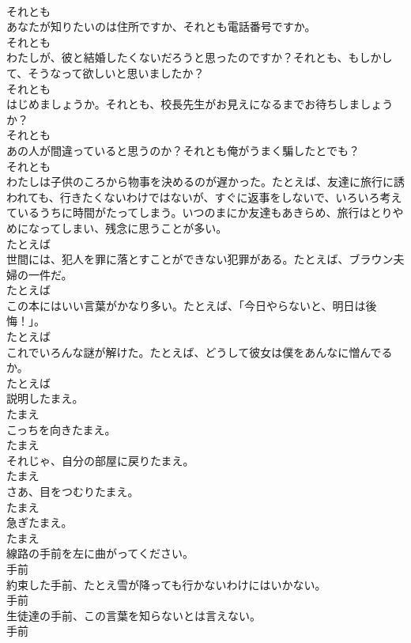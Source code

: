 \documentclass[8pt]{extreport}
\begin{document}
\begin{CJK}{UTF8}{min}
\\	それとも
\\	あなたが知りたいのは住所ですか、それとも電話番号ですか。	
\\	それとも
\\	わたしが、彼と結婚したくないだろうと思ったのですか？それとも、もしかして、そうなって欲しいと思いましたか？	
\\	それとも
\\	はじめましょうか。それとも、校長先生がお見えになるまでお待ちしましょうか？	
\\	それとも
\\	あの人が間違っていると思うのか？それとも俺がうまく騙したとでも？	
\\	それとも
\\	わたしは子供のころから物事を決めるのが遅かった。たとえば、友達に旅行に誘われても、行きたくないわけではないが、すぐに返事をしないで、いろいろ考えているうちに時間がたってしまう。いつのまにか友達もあきらめ、旅行はとりやめになってしまい、残念に思うことが多い。	
\\	たとえば
\\	世間には、犯人を罪に落とすことができない犯罪がある。たとえば、ブラウン夫婦の一件だ。	
\\	たとえば
\\	この本にはいい言葉がかなり多い。たとえば、「今日やらないと、明日は後悔！」。	
\\	たとえば
\\	これでいろんな謎が解けた。たとえば、どうして彼女は僕をあんなに憎んでるか。	
\\	たとえば
\\	説明したまえ。	
\\	たまえ
\\	こっちを向きたまえ。	
\\	たまえ
\\	それじゃ、自分の部屋に戻りたまえ。	
\\	たまえ
\\	さあ、目をつむりたまえ。	
\\	たまえ
\\	急ぎたまえ。	
\\	たまえ
\\	線路の手前を左に曲がってください。	
\\	手前
\\	約束した手前、たとえ雪が降っても行かないわけにはいかない。	
\\	手前
\\	生徒達の手前、この言葉を知らないとは言えない。	
\\	手前

\end{CJK}
\end{document}

